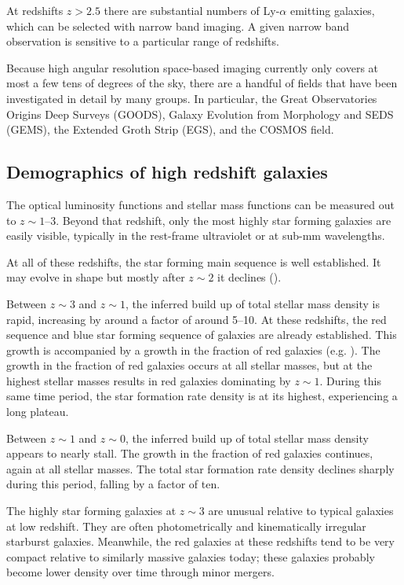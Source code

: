 At redshifts $z>2.5$ there are substantial numbers of Ly-$\alpha$
emitting galaxies, which can be selected with narrow band imaging. A
given narrow band observation is sensitive to a particular range of
redshifts. 

Because high angular resolution space-based imaging currently only
covers at most a few tens of degrees of the sky, there are a handful
of fields that have been investigated in detail by many groups. In
particular, the Great Observatories Origins Deep Surveys (GOODS),
Galaxy Evolution from Morphology and SEDS (GEMS), the Extended Groth
Strip (EGS), and the COSMOS field.

\subsection{Demographics of high redshift galaxies}

The optical luminosity functions and stellar mass functions can be
measured out to $z\sim 1$--3. Beyond that redshift, only the most
highly star forming galaxies are easily visible, typically in the
rest-frame ultraviolet or at sub-mm wavelengths.

At all of these redshifts, the star forming main sequence is well
established. It may evolve in shape but mostly after $z\sim 2$ it
declines (\citealt{whitaker14a}).

Between $z\sim 3$ and $z\sim 1$, the inferred build up of total
stellar mass density is rapid, increasing by around a factor of around
5--10. At these redshifts, the red sequence and blue star forming
sequence of galaxies are already established. This growth is
accompanied by a growth in the fraction of red galaxies
(e.g. \citealt{mortlock15a}). The growth in the fraction of red
galaxies occurs at all stellar masses, but at the highest stellar
masses results in red galaxies dominating by $z\sim 1$. During this
same time period, the star formation rate density is at its highest,
experiencing a long plateau.

Between $z\sim 1$ and $z\sim 0$, the inferred build up of total
stellar mass density appears to nearly stall. The growth in the
fraction of red galaxies continues, again at all stellar masses. The
total star formation rate density declines sharply during this period,
falling by a factor of ten.

The highly star forming galaxies at $z\sim 3$ are unusual relative to
typical galaxies at low redshift. They are often photometrically and
kinematically irregular starburst galaxies. Meanwhile, the red
galaxies at these redshifts tend to be very compact relative to
similarly massive galaxies today; these galaxies probably become lower
density over time through minor mergers.

